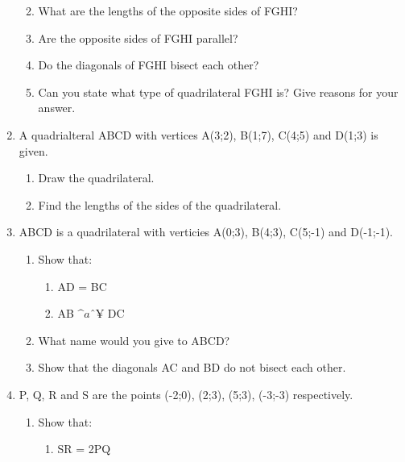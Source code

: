 \begin{enumerate}[noitemsep, label=\textbf{\arabic*}. ]
\begin{enumerate}[noitemsep, label=\textbf{\alph*}. ]
            \label{m39167*uid47}\item 
What are the lengths of the opposite sides of FGHI?
\label{m39167*uid48}\item Are the opposite sides of FGHI parallel?
\label{m39167*uid49}\item  Do the diagonals of FGHI bisect each other?
\label{m39167*uid50}\item  Can you state what type of quadrilateral FGHI is? Give reasons for your answer.
\end{enumerate}
                \label{m39167*uid51}\item 
A quadrialteral ABCD with vertices A(3;2), B(1;7), C(4;5) and D(1;3) is given.
\label{m39167*id69770}\begin{enumerate}[noitemsep, label=\textbf{\alph*}. ] 
            \label{m39167*uid52}\item  Draw the quadrilateral.
\label{m39167*uid53}\item  Find the lengths of the sides of the quadrilateral.
\end{enumerate}
                \label{m39167*uid54}\item ABCD is a quadrilateral with verticies A(0;3), B(4;3), C(5;-1) and D(-1;-1).
\label{m39167*id69816}\begin{enumerate}[noitemsep, label=\textbf{\alph*}. ] 
            \label{m39167*uid55}\item Show that:
\label{m39167*id69834}\begin{enumerate}[noitemsep, label=\textbf{\roman*}. ] 
            \label{m39167*uid56}\item AD = BC
\label{m39167*uid57}\item AB $\^{a}ˆ¥$ DC
\end{enumerate}
        \label{m39167*uid58}\item What name would you give to ABCD?
\label{m39167*uid59}\item Show that the diagonals AC and BD do not bisect each other.
\end{enumerate}
                \label{m39167*uid60}\item P, Q, R and S are the points (-2;0), (2;3), (5;3), (-3;-3) respectively.
\label{m39167*id69919}\begin{enumerate}[noitemsep, label=\textbf{\alph*}. ] 
            \label{m39167*uid61}\item Show that:
\label{m39167*id69937}\begin{enumerate}[noitemsep, label=\textbf{\roman*}. ] 
            \label{m39167*uid62}\item SR = 2PQ

\end{enumerate}
\end{enumerate}
\end{enumerate}
